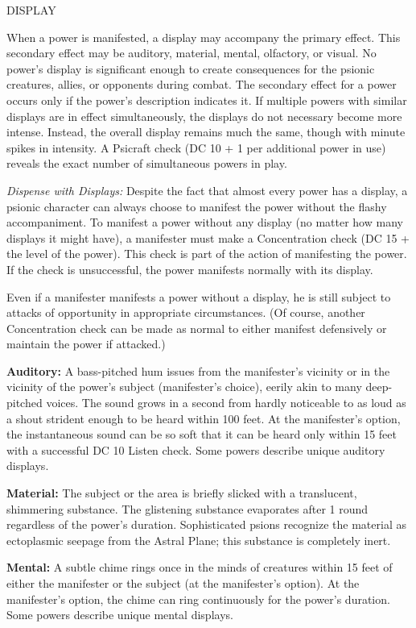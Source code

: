 \documentclass{article}
\begin{document}
\vspace{12pt}
DISPLAY

When a power is manifested, a display may accompany the primary effect. This secondary 
effect may be auditory, material, mental, olfactory, or visual. No power's display 
is significant enough to create consequences for the psionic creatures, allies, 
or opponents during combat. The secondary effect for a power occurs only if the 
power's description indicates it. If multiple powers with similar displays are 
in effect simultaneously, the displays do not necessary become more intense. Instead, 
the overall display remains much the same, though with minute spikes in intensity. 
A Psicraft check (DC 10 + 1 per additional power in use) reveals the exact number 
of simultaneous powers in play.

\textit{Dispense with Displays: }Despite the fact that almost every power has a 
display, a psionic character can always choose to manifest the power without the 
flashy accompaniment. To manifest a power without any display (no matter how many 
displays it might have), a manifester must make a Concentration check (DC 15 + 
the level of the power). This check is part of the action of manifesting the power. 
If the check is unsuccessful, the power manifests normally with its display.

Even if a manifester manifests a power without a display, he is still subject to 
attacks of opportunity in appropriate circumstances. (Of course, another Concentration 
check can be made as normal to either manifest defensively or maintain the power 
if attacked.)

\textbf{Auditory: }A bass-pitched hum issues from the manifester's vicinity or 
in the vicinity of the power's subject (manifester's choice), eerily akin to many 
deep-pitched voices. The sound grows in a second from hardly noticeable to as loud 
as a shout strident enough to be heard within 100 feet. At the manifester's option, 
the instantaneous sound can be so soft that it can be heard only within 15 feet 
with a successful DC 10 Listen check. Some powers describe unique auditory displays.

\textbf{Material:} The subject or the area is briefly slicked with a translucent, 
shimmering substance. The glistening substance evaporates after 1 round regardless 
of the power's duration. Sophisticated psions recognize the material as ectoplasmic 
seepage from the Astral Plane; this substance is completely inert.

\textbf{Mental:} A subtle chime rings once in the minds of creatures within 15 
feet of either the manifester or the subject (at the manifester's option). At the 
manifester's option, the chime can ring continuously for the power's duration. 
Some powers describe unique mental displays. 
\end{document}
